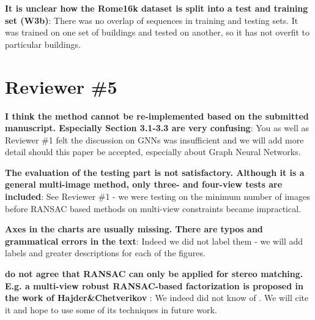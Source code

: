 \documentclass[10pt,twocolumn,letterpaper]{article}
\begin{document}
\textbf{It is unclear how the Rome16k dataset is split into a test and training set (W3b)}:
There was no overlap of sequences in training and testing sets. It was trained on one set of buildings and tested on another, so it has not overfit to particular buildings.

\section{Reviewer \#5}

\textbf{I think the method cannot be re-implemented based on the submitted manuscript. Especially Section 3.1-3.3 are very confusing}:
You as well as Reviewer \#1 felt the discussion on GNNs was insufficient and we will add more detail should this paper be accepted, especially about Graph Neural Networks.

\textbf{The evaluation of the testing part is not satisfactory. Although it is a general multi-image method, only three- and four-view tests are included}:
See Reviewer \#1 - we were testing on the minimum number of images before RANSAC based methods on multi-view constraints became impractical.

\textbf{Axes in the charts are usually missing. There are typos and grammatical errors in the text}:
Indeed we did not label them - we will add labels and greater descriptions for each of the figures.

\textbf{ do not agree that RANSAC can only be applied for stereo matching. E.g. a multi-view robust RANSAC-based factorization is proposed in the work of Hajder\&Chetverikov }:
We indeed did not know of \cite{hajder2006weak}. We will cite it and hope to use some of its techniques in future work.
\end{document}
